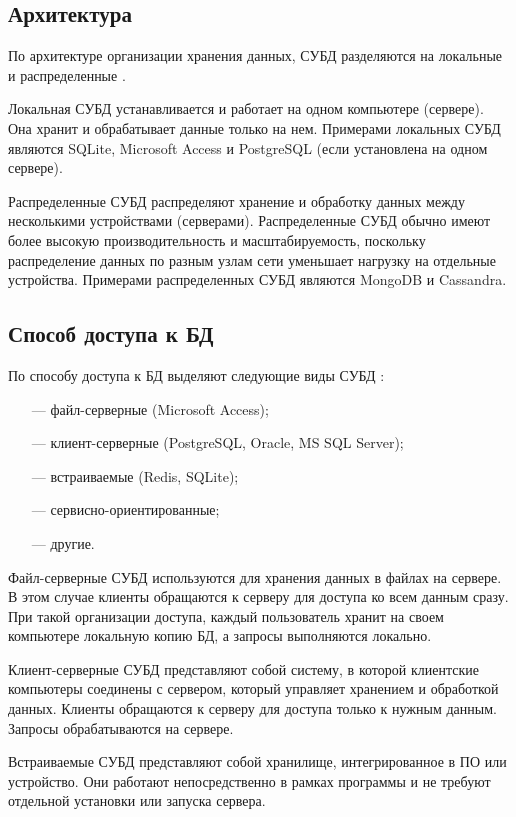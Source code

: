 \subsection{Архитектура}
По архитектуре организации хранения данных, СУБД разделяются на локальные и распределенные \cite{src_db}.

Локальная СУБД устанавливается и работает на одном компьютере (сервере).
Она хранит и обрабатывает данные только на нем.
Примерами локальных СУБД являются SQLite, Microsoft Access и PostgreSQL (если установлена на одном сервере).

Распределенные СУБД распределяют хранение и обработку данных между несколькими устройствами (серверами).
Распределенные СУБД обычно имеют более высокую производительность и масштабируемость, поскольку распределение данных по разным узлам сети уменьшает нагрузку на отдельные устройства.
Примерами распределенных СУБД являются MongoDB и Cassandra.

\subsection{Способ доступа к БД}
По способу доступа к БД выделяют следующие виды СУБД \cite{src_db}:
\begin{itemize}
	\item[---] файл-серверные (Microsoft Access);
	\item[---] клиент-серверные (PostgreSQL, Oracle, MS SQL Server);
	\item[---] встраиваемые (Redis, SQLite);
	\item[---] сервисно-ориентированные;
	\item[---] другие.
\end{itemize}

Файл-серверные СУБД используются для хранения данных в файлах на сервере.
В этом случае клиенты обращаются к серверу для доступа ко всем данным сразу.
При такой организации доступа, каждый пользователь хранит на своем компьютере локальную копию БД, а запросы выполняются локально.

Клиент-серверные СУБД представляют собой систему, в которой клиентские компьютеры соединены с сервером, который управляет хранением и обработкой данных.
Клиенты обращаются к серверу для доступа только к нужным данным.
Запросы обрабатываются на сервере.

Встраиваемые СУБД представляют собой хранилище, интегрированное в ПО или устройство.
Они работают непосредственно в рамках программы и не требуют отдельной установки  или запуска сервера.

